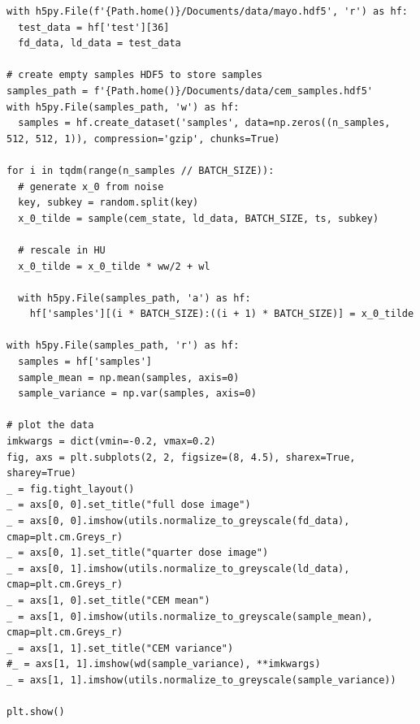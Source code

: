 \documentclass[a4paper, 11pt]{article}
\begin{document}
\begin{verbatim}
with h5py.File(f'{Path.home()}/Documents/data/mayo.hdf5', 'r') as hf:
  test_data = hf['test'][36]
  fd_data, ld_data = test_data

# create empty samples HDF5 to store samples
samples_path = f'{Path.home()}/Documents/data/cem_samples.hdf5'
with h5py.File(samples_path, 'w') as hf:
  samples = hf.create_dataset('samples', data=np.zeros((n_samples, 512, 512, 1)), compression='gzip', chunks=True)

for i in tqdm(range(n_samples // BATCH_SIZE)):
  # generate x_0 from noise
  key, subkey = random.split(key)
  x_0_tilde = sample(cem_state, ld_data, BATCH_SIZE, ts, subkey)

  # rescale in HU
  x_0_tilde = x_0_tilde * ww/2 + wl

  with h5py.File(samples_path, 'a') as hf:
    hf['samples'][(i * BATCH_SIZE):((i + 1) * BATCH_SIZE)] = x_0_tilde

with h5py.File(samples_path, 'r') as hf:
  samples = hf['samples']
  sample_mean = np.mean(samples, axis=0)
  sample_variance = np.var(samples, axis=0)

# plot the data
imkwargs = dict(vmin=-0.2, vmax=0.2)
fig, axs = plt.subplots(2, 2, figsize=(8, 4.5), sharex=True, sharey=True)
_ = fig.tight_layout()
_ = axs[0, 0].set_title("full dose image")
_ = axs[0, 0].imshow(utils.normalize_to_greyscale(fd_data), cmap=plt.cm.Greys_r)
_ = axs[0, 1].set_title("quarter dose image")
_ = axs[0, 1].imshow(utils.normalize_to_greyscale(ld_data), cmap=plt.cm.Greys_r)
_ = axs[1, 0].set_title("CEM mean")
_ = axs[1, 0].imshow(utils.normalize_to_greyscale(sample_mean), cmap=plt.cm.Greys_r)
_ = axs[1, 1].set_title("CEM variance")
#_ = axs[1, 1].imshow(wd(sample_variance), **imkwargs)
_ = axs[1, 1].imshow(utils.normalize_to_greyscale(sample_variance))

plt.show()
\end{verbatim}
\end{document}
